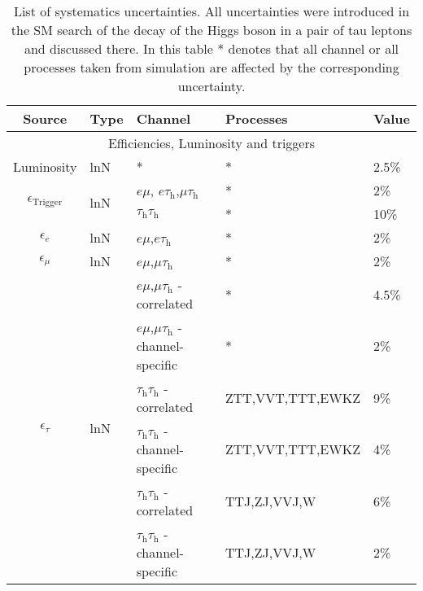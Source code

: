 \begin{table}[!]
    \centering
    \caption{List of systematics uncertainties. All uncertainties were introduced in the SM search of the decay of the Higgs boson in a pair of tau leptons
    and discussed there. In this table * denotes that all channel or all processes taken from simulation are affected by the corresponding uncertainty.}\label{SU:sys_uncs}
    \begin{tabular}{cllll}
        \toprule
        Source                                  & Type                  & Channel                       & Processes & Value \\ \hline
        \multicolumn{5}{c}{Efficiencies, Luminosity and triggers} \\ \midrule
        Luminosity                              & lnN                   &   *                           & *         & 2.5\% \\ 
        \multirow{2}{*}{$\epsilon_\text{Trigger}$ }  & \multirow{2}{*}{lnN}  & $e\mu$, $e\tau_\text{h}$,$\mu\tau_\text{h}$ & * & 2\% \\
                                                &                       & $\tau_\text{h}\tau_\text{h}$                & * & 10\% \\ \hline
        $\epsilon_{e}$                          & lnN                   & $e\mu$,$e\tau_\text{h}$              & * & 2\% \\  
        $\epsilon_{\mu}$                        & lnN                   & $e\mu$,$\mu\tau_\text{h}$            & * & 2\% \\  
        \multirow{6}{*}{$\epsilon_{\tau}$}      & \multirow{6}{*}{lnN}  & $e\mu$,$\mu\tau_\text{h}$ - correlated            & * & 4.5\% \\ 
                                                &                       & $e\mu$,$\mu\tau_\text{h}$ - channel-specific & * & 2\%  \\  
                                                &                       & $\tau_\text{h}\tau_\text{h}$ - correlated & ZTT,VVT,TTT,EWKZ & 9\%  \\  
                                                &                       & $\tau_\text{h}\tau_\text{h}$ - channel-specific & ZTT,VVT,TTT,EWKZ & 4\%  \\  
                                                &                       & $\tau_\text{h}\tau_\text{h}$ - correlated & TTJ,ZJ,VVJ,W            & 6\%  \\  
                                                &                       & $\tau_\text{h}\tau_\text{h}$ - channel-specific & TTJ,ZJ,VVJ,W  & 2\%  \\ \hline  

\end{tabular}
\end{table}
